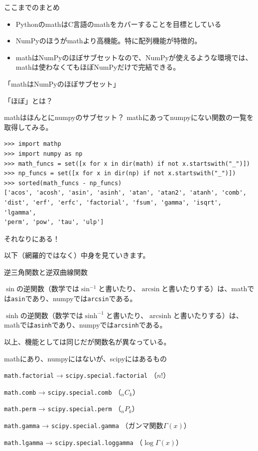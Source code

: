 \documentclass[unicode,lualatex,aspectratio=169]{beamer}
\DeclareMathOperator{\arcsinh}{arcsinh}
\begin{document}
\begin{frame}[fragile]{ここまでのまとめ}
  \begin{itemize}
  \item PythonのmathはC言語のmathをカバーすることを目標としている
  \item NumPyのほうがmathより高機能。特に配列機能が特徴的。
  \item mathはNumPyのほぼサブセットなので、NumPyが使えるような環境では、mathは使わなくてもほぼNumPyだけで完結できる。
  \end{itemize}
\end{frame}
\begin{frame}
  「mathはNumPyのほぼサブセット」

  
  「ほぼ」とは？
\end{frame}
\begin{frame}[fragile]{mathはほんとにnumpyのサブセット？}
mathにあってnumpyにない関数の一覧を取得してみる。
{\fontsize{6pt}{6pt}\selectfont    
\begin{verbatim}
>>> import mathp
>>> import numpy as np
>>> math_funcs = set([x for x in dir(math) if not x.startswith("_")])
>>> np_funcs = set([x for x in dir(np) if not x.startswith("_")])
>>> sorted(math_funcs - np_funcs)
['acos', 'acosh', 'asin', 'asinh', 'atan', 'atan2', 'atanh', 'comb', 
'dist', 'erf', 'erfc', 'factorial', 'fsum', 'gamma', 'isqrt', 'lgamma',
'perm', 'pow', 'tau', 'ulp']
\end{verbatim}
}
それなりにある！

以下（網羅的ではなく）中身を見ていきます。
\end{frame}
\begin{frame}[fragile]{逆三角関数と逆双曲線関数}
  
  $\sin$の逆関数（数学では$\sin^{-1}$と書いたり、$\arcsin$と書いたりする）は、mathでは\verb|asin|であり、numpyでは\verb|arcsin|である。

  
  $\sinh$の逆関数（数学では$\sinh^{-1}$と書いたり、$\arcsinh$と書いたりする）は、mathでは\verb|asinh|であり、numpyでは\verb|arcsinh|である。

  以上、機能としては同じだが関数名が異なっている。
\end{frame}
\begin{frame}[fragile]{mathにあり、numpyにはないが、scipyにはあるもの}
  
  \verb|math.factorial| → \verb|scipy.special.factorial| （$n!$）
  
  \verb|math.comb| → \verb|scipy.special.comb| （${}_n C_k$）
  
  \verb|math.perm| → \verb|scipy.special.perm| （${}_n P_k$）

  \verb|math.gamma| → \verb|scipy.special.gamma| （ガンマ関数$\Gamma(x)$）
  
  \verb|math.lgamma| → \verb|scipy.special.loggamma| （$\log \Gamma(x)$）
\end{frame}
\end{document}
